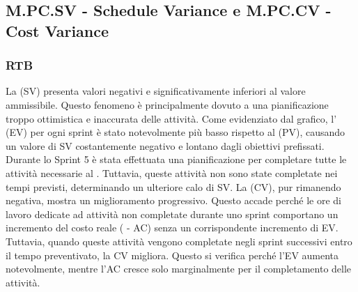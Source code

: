 \subsection{M.PC.SV - Schedule Variance e M.PC.CV - Cost Variance}
\label{sec:SV&CV}

\subsubsection{RTB}
La  (SV) presenta valori negativi e significativamente inferiori al valore ammissibile. 
Questo fenomeno è principalmente dovuto a una pianificazione troppo ottimistica e inaccurata delle attività. 
Come evidenziato dal grafico, l' (EV) per ogni sprint è stato notevolmente più basso rispetto al  (PV), causando un valore di SV costantemente negativo e lontano dagli obiettivi prefissati. 
Durante lo Sprint 5 è stata effettuata una pianificazione per completare tutte le attività necessarie al . 
Tuttavia, queste attività non sono state completate nei tempi previsti, determinando un ulteriore calo di SV.
La  (CV), pur rimanendo negativa, mostra un miglioramento progressivo. Questo accade perché le ore di lavoro dedicate ad attività non completate durante uno sprint comportano un incremento del costo reale ( - AC) senza un corrispondente incremento di EV.
Tuttavia, quando queste attività vengono completate negli sprint successivi entro il tempo preventivato, la CV migliora. 
Questo si verifica perché l'EV aumenta notevolmente, mentre l'AC cresce solo marginalmente per il completamento delle attività.

